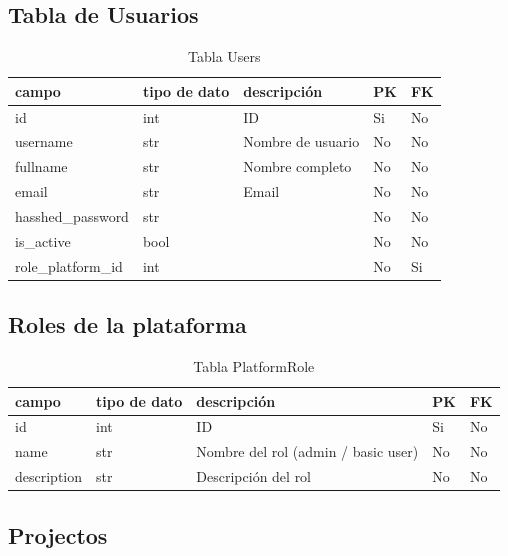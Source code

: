 \subsection{Tabla de Usuarios}
\begin{table}[H]
    \begin{tabular}{|l|l|l|l|l|}
        \hline
        campo              & tipo de dato & descripción       & PK & FK \\ \hline
        id                 & int          & ID                & Si & No \\ \hline
        username           & str          & Nombre de usuario & No & No \\ \hline
        fullname           & str          & Nombre completo   & No & No \\ \hline
        email              & str          & Email             & No & No \\ \hline
        hasshed\_password  & str          &                   & No & No \\ \hline
        is\_active         & bool         &                   & No & No \\ \hline
        role\_platform\_id & int          &                   & No & Si \\ \hline
    \end{tabular}
    \caption{Tabla Users}
    \label{tab:db-users}
\end{table}
\subsection{Roles de la plataforma}
\begin{table}[H]
    \begin{tabular}{|l|l|l|l|l|}
        \hline
        campo       & tipo de dato & descripción                         & PK & FK \\ \hline
        id          & int          & ID                                  & Si & No \\ \hline
        name        & str          & Nombre del rol (admin / basic user) & No & No \\ \hline
        description & str          & Descripción del rol                 & No & No \\ \hline
    \end{tabular}
    \caption{Tabla PlatformRole}
    \label{tab:db-platformRole}
\end{table}
\subsection{Projectos}


